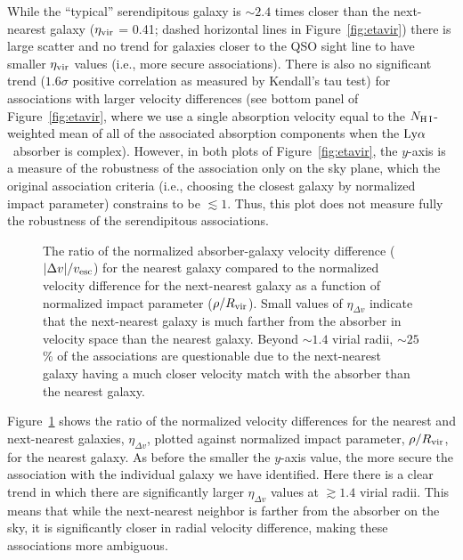 \documentclass[twocolumn,twocolappendix,tighten,times]{aastex6}
\newcommand{\lya}{\ensuremath{{\rm Ly}\alpha}}
\begin{document}
While the ``typical'' serendipitous galaxy is $\sim2.4$ times closer than the 
next-nearest galaxy ($\eta_{\rm vir}$ = 0.41; dashed horizontal lines in 
Figure~\ref{fig:etavir}) there is large scatter and no trend for galaxies closer to 
the QSO sight line to have smaller $\eta_{\rm vir}$ values (i.e., more secure 
associations). There is also no significant trend ($1.6\sigma$ positive correlation 
as measured by Kendall's tau test) for associations with larger velocity differences 
(see bottom panel of Figure~\ref{fig:etavir}, where we use a single absorption 
velocity equal to the $N_{\rm H\,I}$-weighted mean of all of the associated 
absorption components when the \lya\ absorber is complex). However, in both plots of 
Figure~\ref{fig:etavir}, the $y$-axis is a measure of the robustness of the 
association only on the sky plane, which the original association criteria (i.e., 
choosing the closest galaxy by normalized impact parameter) constrains to be 
$\lesssim1$. Thus, this plot does not measure fully the robustness of the 
serendipitous associations. 


\begin{figure}[!t]
\caption{The ratio of the normalized absorber-galaxy velocity difference ($|\Delta v|/v_{\rm esc}$) for the nearest galaxy compared to the normalized velocity difference for the next-nearest galaxy as a function of normalized impact parameter ($\rho/R_{\rm vir}$). Small values of $\eta_{\Delta v}$ indicate that the next-nearest galaxy is much farther from the absorber in velocity space than the nearest galaxy. Beyond $\sim1.4$ virial radii, $\sim25$\% of the associations are questionable due to the next-nearest galaxy having a much closer velocity match with the absorber than the nearest galaxy.
\label{fig:etavel}}
\end{figure}


Figure~\ref{fig:etavel} shows the ratio of the normalized velocity differences 
for the nearest and next-nearest galaxies, $\eta_{\Delta v}$, plotted against 
normalized impact parameter, $\rho/R_{\rm vir}$, for the nearest galaxy. As 
before the smaller the $y$-axis value, the more secure the association with 
the individual galaxy we have identified. Here there is a clear trend in which 
there are significantly larger $\eta_{\Delta v}$ values at $\gtrsim1.4$ virial 
radii. This means that while the next-nearest neighbor is farther from the absorber 
on the sky, it is significantly closer in radial velocity difference, making these 
associations more ambiguous. 
\end{document}
